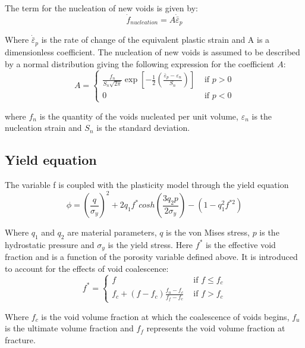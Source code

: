 \documentclass[sn-mathphys,Numbered,draft]{sn-jnl}%
\begin{document}
The term for the nucleation of new voids is given by:
\begin{equation}
	{\dot{f}}_{nucleation}=A{\dot{\bar{\varepsilon}}}_p	
\end{equation}


Where ${\dot{\bar{\varepsilon}}}_p$ is the rate of change of the equivalent plastic strain and A is a dimensionless coefficient.
The nucleation of new voids is assumed to be described by a normal distribution \cite{chu_void_1980} giving the following expression for the coefficient $A$:
\begin{equation}
\label{eqn:nucleatonA}
A= \begin{cases}\frac{f_n}{S_n \sqrt{2 \pi}} \exp \left[-\frac{1}{2}\left(\frac{\bar{\varepsilon}_p-\varepsilon_n}{S_n}\right)\right] & \text { if } p>0 \\ 0 & \text { if } p<0\end{cases}
\end{equation}

where $f_n$ is the quantity of the voids nucleated per unit volume, $\varepsilon_n$ is the nucleation strain and $S_n$ is the standard deviation. 

\subsection{Yield equation}

The variable f is coupled with the plasticity model through the yield equation 
\begin{equation}
	\phi=\left(\frac{q}{\sigma_y}\right)^2+2q_1f^\ast cosh\left(\frac{3q_2p}{2\sigma_y}\right)-\left(1-q_1^2f^{\ast2}\right)
\end{equation}

Where $q_1$ and $q_2$ are material parameters, $q$ is the von Mises stress, $p$ is the hydrostatic pressure and $\sigma_y$ is the yield stress.
Here $f^\ast$ is the effective void fraction and is a function of the porosity variable defined above. It is introduced to account for the effects of void coalescence:
\begin{equation}
\label{eqn:GTNCoalescence}
f^*=\left\{\begin{array}{cc}
f & \text { if } f \leq f_c \\
f_c+\left(f-f_c\right) \frac{f_u-f_c}{f_f-f_c} & \text { if } f>f_c
\end{array}\right.
\end{equation}

Where $f_c$ is the void volume fraction at which the coalescence of voids begins,  $f_u$ is the ultimate volume fraction and $f_f$ represents the void volume fraction at fracture.
\end{document}
